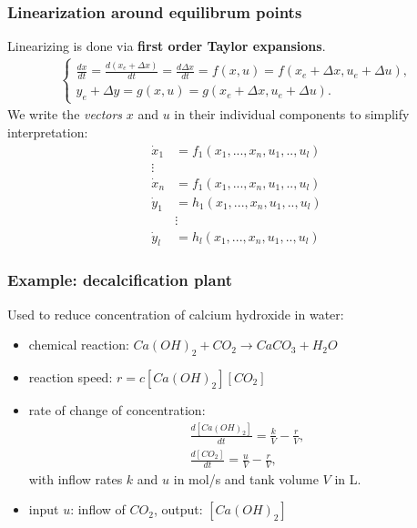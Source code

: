 \begin{frame}
	\frametitle{Linearization around equilibrum points}
	Linearizing is done via \textbf{first order Taylor expansions}.
	\begin{align*}
	\left\{ \begin{matrix}
	\frac{dx}{dt} = \frac{d (x_e + \Delta x)}{dt} = \frac{d \Delta x}{dt} = f(x,u) = f(x_e+\Delta x, u_e + \Delta u), \\
	y_e + \Delta y = g(x, u) = g(x_e + \Delta x, u_e + \Delta u).
	\end{matrix}\right.
	\end{align*}
	We write the \emph{vectors} $x$ and $u$ in their individual components to simplify interpretation:
	\begin{align*}
		\dot{x}_1 &= f_1(x_1, ..., x_n, u_1, .., u_l) \\
			\vdots& \\
		\dot{x}_n &= f_1(x_1, ..., x_n, u_1, .., u_l) \\
		\dot{y}_1 &= h_1(x_1, ..., x_n, u_1, .., u_l) \\
			&\vdots \\
		\dot{y}_l &= h_l(x_1, ..., x_n, u_1, .., u_l) 
	\end{align*}
\end{frame}

 \begin{frame}
 	
 \end{frame}

\begin{frame}
	\frametitle{Example: decalcification plant}
	Used to reduce concentration of calcium hydroxide in water:
	\begin{itemize}
		\item chemical reaction: $Ca(OH)_2 + CO_2 \rightarrow CaCO_3 + H_2O$
		\item reaction speed: $r = c[Ca(OH)_2][CO_2]$
		\item rate of change of concentration:
		\begin{align*}
		\frac{d[Ca(OH)_2]}{dt} = \frac{k}{V} - \frac{r}{V}, \\
		\frac{d[CO_2]}{dt} = \frac{u}{V} - \frac{r}{V}, 
		\end{align*}
		with inflow rates $k$ and $u$ in mol/s and tank volume $V$ in L.
		\item input $u$: inflow of $CO_2$, output: $[Ca(OH)_2]$
	\end{itemize}
\end{frame}

